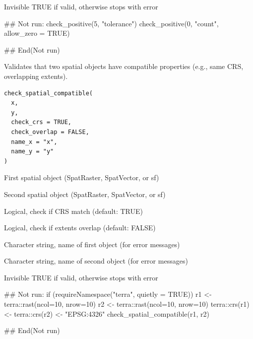 \documentclass[a4paper]{book}
\begin{document}
%
\begin{Value}
Invisible TRUE if valid, otherwise stops with error
\end{Value}
%
\begin{Examples}
\begin{ExampleCode}
## Not run: 
check_positive(5, "tolerance")
check_positive(0, "count", allow_zero = TRUE)

## End(Not run)
\end{ExampleCode}
\end{Examples}
%
\begin{Description}\relax
Validates that two spatial objects have compatible properties
(e.g., same CRS, overlapping extents).
\end{Description}
%
\begin{Usage}
\begin{verbatim}
check_spatial_compatible(
  x,
  y,
  check_crs = TRUE,
  check_overlap = FALSE,
  name_x = "x",
  name_y = "y"
)
\end{verbatim}
\end{Usage}
%
\begin{Arguments}
\begin{ldescription}
\item[\code{x}] First spatial object (SpatRaster, SpatVector, or sf)

\item[\code{y}] Second spatial object (SpatRaster, SpatVector, or sf)

\item[\code{check\_crs}] Logical, check if CRS match (default: TRUE)

\item[\code{check\_overlap}] Logical, check if extents overlap (default: FALSE)

\item[\code{name\_x}] Character string, name of first object (for error messages)

\item[\code{name\_y}] Character string, name of second object (for error messages)
\end{ldescription}
\end{Arguments}
%
\begin{Value}
Invisible TRUE if valid, otherwise stops with error
\end{Value}
%
\begin{Examples}
\begin{ExampleCode}
## Not run: 
if (requireNamespace("terra", quietly = TRUE)) {
  r1 <- terra::rast(ncol=10, nrow=10)
  r2 <- terra::rast(ncol=10, nrow=10)
  terra::crs(r1) <- terra::crs(r2) <- "EPSG:4326"
  check_spatial_compatible(r1, r2)
}

## End(Not run)
\end{ExampleCode}
\end{Examples}
\end{document}
